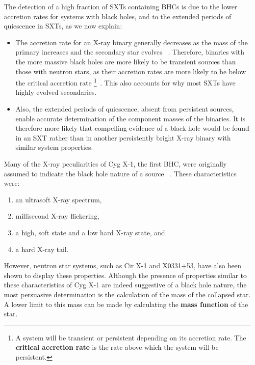 The detection of a high fraction of SXTs containing BHCs is due to the lower accretion rates for systems with black holes, and to the extended periods of quiescence in
SXTs, as we now explain:
\begin{itemize}

\item
The accretion rate for an X-ray binary generally decreases as the mass
of the primary increases and the secondary star evolves~\cite{Casares:2001}%
. Therefore, binaries with the more massive black holes are more
likely to be transient sources than those with neutron stars, as their
accretion rates are more likely to be below the critical accretion
rate%
\footnote{\label{cha:Introduction:sec:X-rayBinaries:subsec:BHCSXTs:foot:CritAccRate}%
A system will be transient or persistent depending on its accretion rate. The \textbf{critical accretion rate} is the rate above which the system will be persistent. %
}~\cite{KingKolbBurderi:1996}. This also accounts for why most SXTs have highly evolved
secondaries. %

\item
Also, the extended periods of quiescence, absent from persistent
sources, enable accurate determination of the component masses of the
binaries. It is therefore more likely that compelling evidence of a
black hole would be found in an SXT rather than in another persistently bright X-ray binary with
similar system properties. %

\end{itemize}

Many of the X-ray peculiarities of Cyg X-1, the first BHC, were
originally assumed to indicate the black hole nature of a
source~\cite{TanakaLewin:1995}%
. These characteristics were:
\begin{enumerate}
\item\label{cha:Introduction:sec:X-rayBinaries:subsec:BHCSXTs:enu:ultrasoft}
an ultrasoft X-ray spectrum,
\item\label{cha:Introduction:sec:X-rayBinaries:subsec:BHCSXTs:enu:millisecond}
millisecond X-ray flickering,
\item\label{cha:Introduction:sec:X-rayBinaries:subsec:BHCSXTs:enu:twostates}
a high, soft state and a low hard X-ray state, and
\item\label{cha:Introduction:sec:X-rayBinaries:subsec:BHCSXTs:enu:hardtail}
a hard X-ray tail.
\end{enumerate}
However, neutron star systems, such as Cir X-1 and X0331+53, have also
been shown to display these properties. Although the presence of properties similar to these
characteristics of Cyg X-1 are indeed suggestive of a black hole
nature, the most persuasive determination is the calculation of the
mass of the collapsed star. A lower limit to this mass can be made by calculating the
\textbf{mass function} of the star. %

